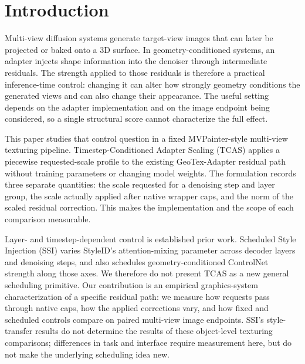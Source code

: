 \documentclass[times,twocolumn,final]{elsarticle}
\providecommand{\DIFadd}[1]{{\protect\color{blue} \sf #1}} %
\providecommand{\DIFaddbegin}{} %
\providecommand{\DIFaddend}{} %
\begin{document}
\linenumbers

\section{Introduction}
\label{sec:intro}

 
 \DIFaddbegin \DIFadd{Multi-view diffusion systems generate target-view images that can later be projected or baked onto a }\DIFaddend 3D  
 \DIFaddbegin \DIFadd{surface. }\DIFaddend In   \DIFaddbegin \DIFadd{geometry-conditioned systems, an adapter injects shape information into the denoiser through intermediate residuals. The strength applied to those residuals is therefore a practical inference-time control: changing it can alter how strongly geometry conditions the generated views and can also change their appearance. The useful setting depends on the adapter implementation and on the image endpoint being considered, so a single structural score cannot characterize the full effect.
}\DIFaddend 

  \DIFaddbegin \DIFadd{This paper studies that control question in a fixed MVPainter-style }\DIFaddend multi-view   \DIFaddbegin \DIFadd{texturing pipeline. Timestep-Conditioned Adapter Scaling (TCAS) applies a piecewise requested-scale profile to the existing GeoTex-Adapter residual path without training parameters or changing model weights. The formulation records three separate quantities: the scale requested for a denoising step and layer group, the scale actually applied after native wrapper caps, and the norm of the scaled residual correction. This makes the implementation and the scope of each comparison measurable}\DIFaddend .

  \DIFaddbegin \DIFadd{Layer- and timestep-dependent control is established prior work. Scheduled Style Injection (SSI) varies StyleID's attention-mixing parameter across decoder layers and denoising steps, and also schedules geometry-conditioned ControlNet strength along those axes. We therefore do not present TCAS as a new general scheduling primitive. Our contribution is an empirical graphics-system characterization of a specific residual path: we measure how requests pass through native caps, how the applied corrections vary, and how fixed and scheduled controls compare on paired }\DIFaddend multi-view   \DIFaddbegin \DIFadd{image endpoints. SSI's style-transfer results do not determine the results of these object-level texturing comparisons; differences in task and interface require measurement here, but do not make the underlying scheduling idea new.
}\DIFaddend 
\end{document}
